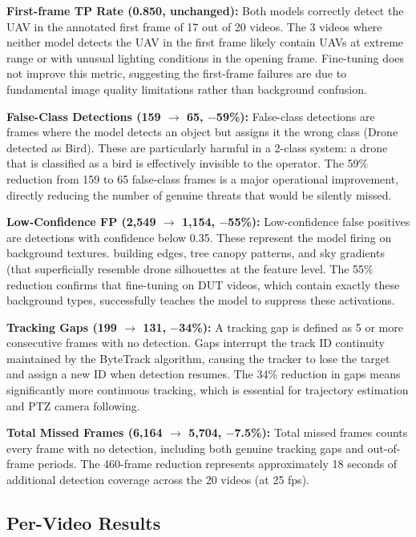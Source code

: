 \documentclass[12pt,a4paper]{report}
\begin{document}
\textbf{First-frame TP Rate (0.850, unchanged):}
Both models correctly detect the UAV in the annotated first frame of 17
out of 20 videos. The 3 videos where neither model detects the UAV in the
first frame likely contain UAVs at extreme range or with unusual lighting
conditions in the opening frame. Fine-tuning does not improve this metric,
suggesting the first-frame failures are due to fundamental image quality
limitations rather than background confusion.

\textbf{False-Class Detections (159 $\to$ 65, $-$59\%):}
False-class detections are frames where the model detects an object but
assigns it the wrong class (Drone detected as Bird). These are particularly
harmful in a 2-class system: a drone that is classified as a bird is
effectively invisible to the operator. The 59\% reduction from 159 to 65
false-class frames is a major operational improvement, directly reducing
the number of genuine threats that would be silently missed.

\textbf{Low-Confidence FP (2,549 $\to$ 1,154, $-$55\%):}
Low-confidence false positives are detections with confidence below 0.35.
These represent the model firing on background textures. building edges,
tree canopy patterns, and sky gradients (that superficially resemble
drone silhouettes at the feature level. The 55\% reduction confirms that
fine-tuning on DUT videos, which contain exactly these background types,
successfully teaches the model to suppress these activations.

\textbf{Tracking Gaps (199 $\to$ 131, $-$34\%):}
A tracking gap is defined as 5 or more consecutive frames with no detection.
Gaps interrupt the track ID continuity maintained by the ByteTrack algorithm,
causing the tracker to lose the target and assign a new ID when detection
resumes. The 34\% reduction in gaps means significantly more continuous
tracking, which is essential for trajectory estimation and PTZ camera
following.

\textbf{Total Missed Frames (6,164 $\to$ 5,704, $-$7.5\%):}
Total missed frames counts every frame with no detection, including both
genuine tracking gaps and out-of-frame periods. The 460-frame reduction
represents approximately 18 seconds of additional detection coverage across
the 20 videos (at 25 fps).

\subsection{Per-Video Results}
\end{document}
